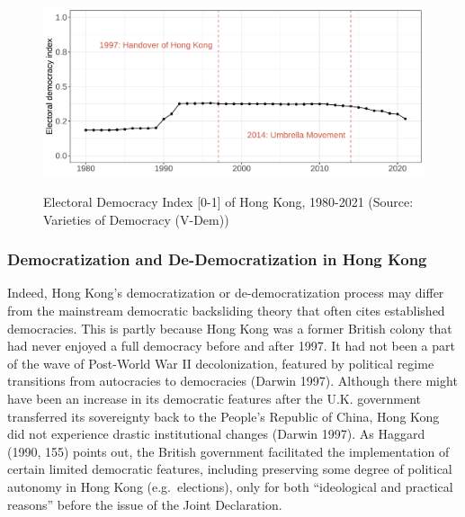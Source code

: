 \documentclass[letterpaper, 12pt]{article}
\begin{document}
\begin{figure}[h!]
\begin{center}
        \includegraphics[scale=0.7]{Visuals/vdem.pdf}
        \caption{Electoral Democracy Index [0-1] of Hong Kong, 1980-2021 (Source: Varieties of Democracy (V-Dem))}
        \label{fig: vdem}
\end{center}
\end{figure}



\subsubsection{Democratization and De-Democratization in Hong Kong}

Indeed, Hong Kong's democratization or de-democratization process may differ from the mainstream democratic backsliding theory that often cites established democracies. This is partly because Hong Kong was a former British colony that had never enjoyed a full democracy before and after 1997. It had not been a part of the wave of Post-World War \mbox{II} decolonization, featured by political regime transitions from autocracies to democracies (Darwin 1997). Although there might have been an increase in its democratic features after the U.K. government transferred its sovereignty back to the People's Republic of China, Hong Kong did not experience drastic institutional changes (Darwin 1997). As Haggard (1990, 155) points out, the British government facilitated the implementation of certain limited democratic features, including preserving some degree of political autonomy in Hong Kong (e.g.\ elections), only for both ``ideological and practical reasons'' before the issue of the Joint Declaration.
\end{document}
